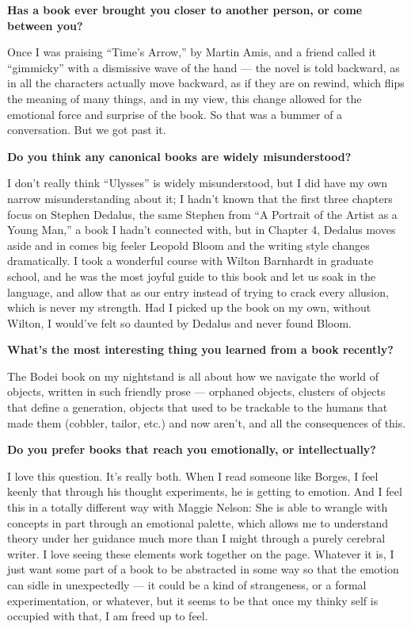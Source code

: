 \textbf{Has a book ever brought you closer to another person, or come
between you?}

Once I was praising ``Time's Arrow,'' by Martin Amis, and a friend
called it ``gimmicky'' with a dismissive wave of the hand --- the novel
is told backward, as in all the characters actually move backward, as if
they are on rewind, which flips the meaning of many things, and in my
view, this change allowed for the emotional force and surprise of the
book. So that was a bummer of a conversation. But we got past it.

\textbf{Do you think any canonical books are widely misunderstood?}

I don't really think ``Ulysses'' is widely misunderstood, but I did have
my own narrow misunderstanding about it; I hadn't known that the first
three chapters focus on Stephen Dedalus, the same Stephen from ``A
Portrait of the Artist as a Young Man,'' a book I hadn't connected with,
but in Chapter 4, Dedalus moves aside and in comes big feeler Leopold
Bloom and the writing style changes dramatically. I took a wonderful
course with Wilton Barnhardt in graduate school, and he was the most
joyful guide to this book and let us soak in the language, and allow
that as our entry instead of trying to crack every allusion, which is
never my strength. Had I picked up the book on my own, without Wilton, I
would've felt so daunted by Dedalus and never found Bloom.

\textbf{What's the most interesting thing you learned from a book
recently?}

The Bodei book on my nightstand is all about how we navigate the world
of objects, written in such friendly prose --- orphaned objects,
clusters of objects that define a generation, objects that used to be
trackable to the humans that made them (cobbler, tailor, etc.) and now
aren't, and all the consequences of this.

\textbf{Do you prefer books that reach you emotionally, or
intellectually?}

I love this question. It's really both. When I read someone like Borges,
I feel keenly that through his thought experiments, he is getting to
emotion. And I feel this in a totally different way with Maggie Nelson:
She is able to wrangle with concepts in part through an emotional
palette, which allows me to understand theory under her guidance much
more than I might through a purely cerebral writer. I love seeing these
elements work together on the page. Whatever it is, I just want some
part of a book to be abstracted in some way so that the emotion can
sidle in unexpectedly --- it could be a kind of strangeness, or a formal
experimentation, or whatever, but it seems to be that once my thinky
self is occupied with that, I am freed up to feel.

